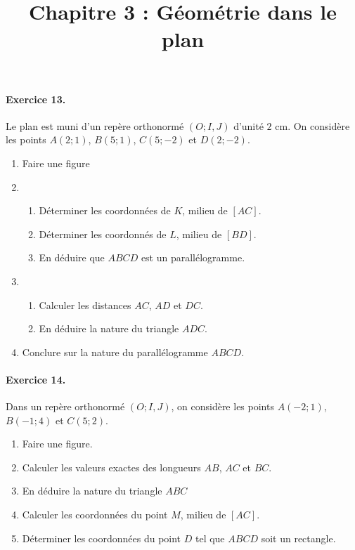 \documentclass[11pt]{article}
\title{Chapitre 3 : Géométrie dans le plan}
\date{}
\author{}
\begin{document}

\paragraph{Exercice 13.} Le plan est muni d'un repère orthonormé $(O; I, J)$
d'unité $2$ cm. On considère les points $A(2; 1)$, $B(5; 1)$, $C(5; -2)$ et
$D(2; -2)$.
\begin{enumerate}
  \item Faire une figure
  \item \begin{enumerate}
      \item Déterminer les coordonnées de $K$, milieu de $\left[ AC
        \right]$.
      \item Déterminer les coordonnés de $L$, milieu de $\left[ BD \right]$.
      \item En déduire que $ABCD$ est un parallélogramme.
    \end{enumerate}
  \item \begin{enumerate}
      \item Calculer les distances $AC$, $AD$ et $DC$.
      \item En déduire la nature du triangle $ADC$.
    \end{enumerate}
  \item Conclure sur la nature du parallélogramme $ABCD$.
\end{enumerate}

\paragraph{Exercice 14.} Dans un repère orthonormé $(O; I, J)$, on considère les
points $A(-2;1)$, $B(-1; 4)$ et $C(5;2)$.
\begin{enumerate}
  \item Faire une figure.
  \item Calculer les valeurs exactes des longueurs $AB$, $AC$ et $BC$.
  \item En déduire la nature du triangle $ABC$
  \item Calculer les coordonnées du point $M$, milieu de $\left[ AC
    \right]$.
  \item Déterminer les coordonnées du point $D$ tel que $ABCD$ soit un
    rectangle.
\end{enumerate}
\end{document}
